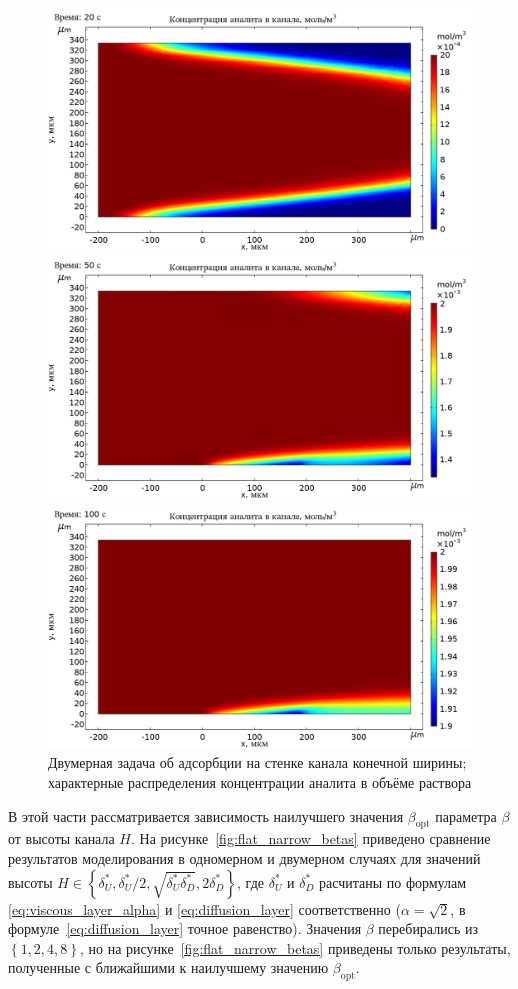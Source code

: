 \documentclass[oneside,final,12pt]{extreport}
\begin{document}
\begin{figure}
  \centering
  \includegraphics[width=.6\textwidth]{pic/flat_narrow_plate_20s}

  \includegraphics[width=.6\textwidth]{pic/flat_narrow_plate_50s}

  \includegraphics[width=.6\textwidth]{pic/flat_narrow_plate_100s}

  \caption{%
    \label{fig:flat_narrow_two_surf_concdistrib}%
    Двумерная задача об адсорбции на стенке канала конечной ширины;
    характерные распределения концентрации аналита в объёме раствора
  }

\end{figure}

В этой части рассматривается зависимость наилучшего значения
$\beta_\text{opt}$ параметра $\beta$ от высоты канала $H$.
На рисунке~\ref{fig:flat_narrow_betas} приведено сравнение
результатов моделирования в одномерном и двумерном случаях
для значений высоты
$H \in \left\{\delta_U^*, \delta_U^*/2, \sqrt{\delta_U^*\delta_D^*}, 2\delta_D^*\right\}$,
где $\delta_U^*$ и $\delta_D^*$
расчитаны по формулам \eqref{eq:viscous_layer_alpha} и \eqref{eq:diffusion_layer}
соответственно ($\alpha = \sqrt{2}$, в формуле~\eqref{eq:diffusion_layer} точное равенство).
Значения $\beta$ перебирались из $\left\{1, 2, 4, 8\right\}$,
но на рисунке~\ref{fig:flat_narrow_betas} приведены только результаты,
полученные с ближайшими к наилучшему значению $\beta_\text{opt}$.
\end{document}
